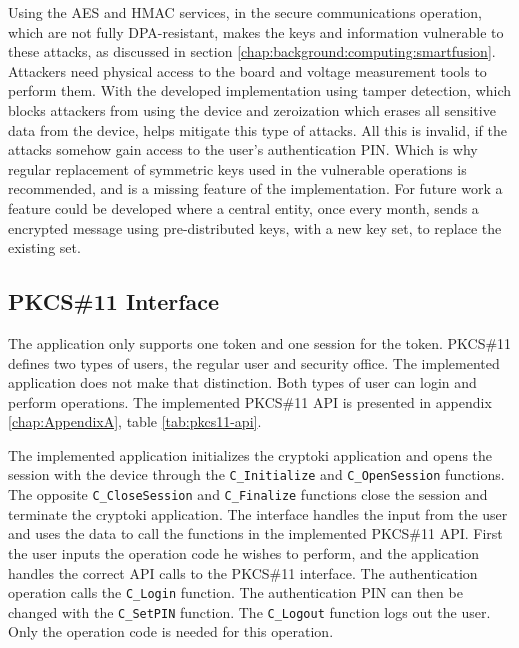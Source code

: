 Using the AES and HMAC services, in the secure communications operation, which are not fully DPA-resistant, makes the keys and information vulnerable to these attacks, as discussed in section \ref{chap:background:computing:smartfusion}.
Attackers need physical access to the board and voltage measurement tools to perform them.
With the developed implementation using tamper detection, which blocks attackers from using the device and zeroization which erases all sensitive data from the device, helps mitigate this type of attacks.
All this is invalid, if the attacks somehow gain access to the user's authentication PIN.
Which is why regular replacement of symmetric keys used in the vulnerable operations is recommended, and is a missing feature of the implementation.
For future work a feature could be developed where a central entity, once every month, sends a encrypted message using pre-distributed keys, with a new key set, to replace the existing set.


\subsection{PKCS\#11 Interface}\label{chap:implementation:app:interface}

The application only supports one token and one session for the token.
PKCS\#11 defines two types of users, the regular user and security office. The implemented application does not make that distinction. Both types of user can login and perform operations.
The implemented PKCS\#11 API is presented in appendix \ref{chap:AppendixA}, table \ref{tab:pkcs11-api}.

The implemented application initializes the cryptoki application and opens the session with the device through the \texttt{C\_Initialize} and \texttt{C\_OpenSession} functions.
The opposite \texttt{C\_CloseSession} and \texttt{C\_Finalize} functions close the session and terminate the cryptoki application.
The interface handles the input from the user and uses the data to call the functions in the implemented PKCS\#11 API.
First the user inputs the operation code he wishes to perform, and the application handles the correct API calls to the PKCS\#11 interface.
The authentication operation calls the \texttt{C\_Login} function. The authentication PIN can then be changed with the \texttt{C\_SetPIN} function.
The \texttt{C\_Logout} function logs out the user. Only the operation code is needed for this operation.


